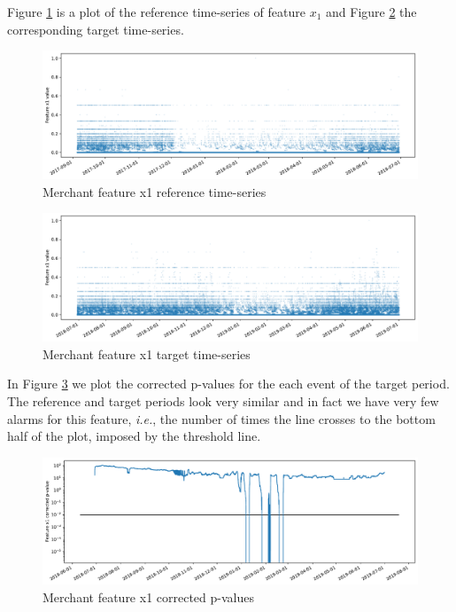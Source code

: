 Figure \ref{fig:merchant-x1-reference} is a plot of the reference time-series of feature $x_1$ and Figure \ref{fig:merchant-x1-target} the corresponding target time-series.
\begin{figure}[!htb]
    \begin{center}
      \includegraphics[scale=0.5]{figures/merchant-x1-reference.pdf}
      \caption{Merchant feature x1 reference time-series}
      \label{fig:merchant-x1-reference}
    \end{center}
\end{figure}
\begin{figure}[!htb]
    \begin{center}
      \includegraphics[scale=0.5]{figures/merchant-x1-target.pdf}
      \caption{Merchant feature x1 target time-series}
      \label{fig:merchant-x1-target}
    \end{center}
\end{figure}
In Figure \ref{fig:merchant-x1-correctedpvalues} we plot the corrected p-values for the each event of the target period. The reference and target periods look very similar and in fact we have very few alarms for this feature, \textit{i.e.}, the number of times the line crosses to the bottom half of the plot, imposed by the threshold line. 
\begin{figure}[!htb]
    \begin{center}
      \includegraphics[scale=0.5]{figures/merchant-x1-correctedpvalues.pdf}
      \caption{Merchant feature x1 corrected p-values}
      \label{fig:merchant-x1-correctedpvalues}
    \end{center}
\end{figure}
